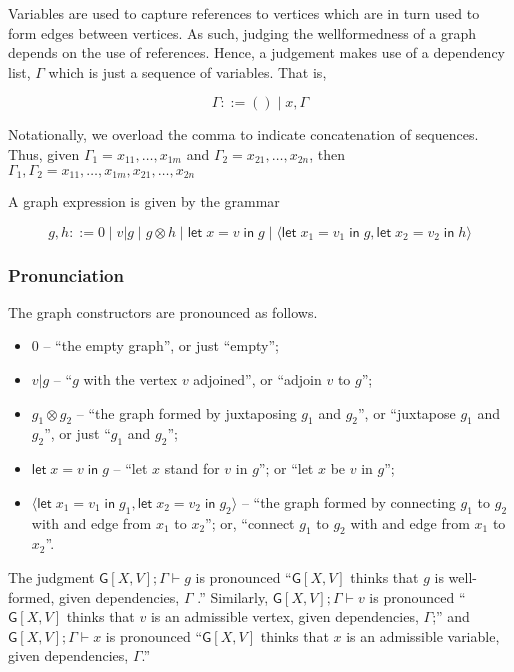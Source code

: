 \documentclass[12pt]{llncs}
\begin{document}
Variables are used to capture references to vertices which are in turn
used to form edges between vertices. As such, judging the wellformedness
of a graph depends on the use of references. Hence, a judgement makes
use of a dependency list, \(\Gamma\) which is just a sequence of
variables. That is,

\[\Gamma ::= () \;|\; x, \Gamma\]

Notationally, we overload the comma to indicate concatenation of
sequences. Thus, given \(\Gamma_1 = x_{11},\ldots,x_{1m}\) and
\(\Gamma_2 = x_{21},\ldots,x_{2n}\), then
\(\Gamma_1,\Gamma_2 = x_{11},\ldots,x_{1m},x_{21},\ldots,x_{2n}\)

A graph expression is given by the grammar

\[g,h ::= 0 \;|\; v|g \;|\; g \otimes h \; |\;\mathsf{let}\; x = v \; \mathsf{in}\; g \;|\; \langle \mathsf{let}\; x_1 = v_1 \; \mathsf{in}\; g, \mathsf{let}\; x_2 = v_2 \; \mathsf{in}\; h\rangle\]

\hypertarget{pronunciation}{%
\subsubsection{Pronunciation}\label{pronunciation}}

The graph constructors are pronounced as follows.

\begin{itemize}
\item
  \(0\) -- ``the empty graph'', or just ``empty'';
\item
  \(v | g\) -- ``\(g\) with the vertex \(v\) adjoined'', or ``adjoin
  \(v\) to \(g\)'';
\item
  \(g_1 \otimes g_2\) -- ``the graph formed by juxtaposing \(g_1\) and
  \(g_2\)'', or ``juxtapose \(g_1\) and \(g_2\)'', or just ``\(g_1\) and
  \(g_2\)'';
\item
  \(\mathsf{let}\; x = v \; \mathsf{in}\; g\) -- ``let \(x\) stand for
  \(v\) in \(g\)''; or ``let \(x\) be \(v\) in \(g\)'';
\item
  \(\langle \mathsf{let}\; x_1 = v_1 \; \mathsf{in}\; g_1,\mathsf{let}\; x_2 = v_2 \; \mathsf{in}\; g_2\rangle\)
  -- ``the graph formed by connecting \(g_1\) to \(g_2\) with and edge
  from \(x_1\) to \(x_2\)''; or, ``connect \(g_1\) to \(g_2\) with and
  edge from \(x_1\) to \(x_2\)''.
\end{itemize}

The judgment \(\mathsf{G}[X,V]; \Gamma \vdash g\) is pronounced
``\(\mathsf{G}[X,V]\) thinks that \(g\) is well-formed, given
dependencies, \(\Gamma\) .'' Similarly,
\(\mathsf{G}[X,V]; \Gamma \vdash v\) is pronounced ``\(\mathsf{G}[X,V]\)
thinks that \(v\) is an admissible vertex, given dependencies,
\(\Gamma\);'' and \(\mathsf{G}[X,V]; \Gamma \vdash x\) is pronounced
``\(\mathsf{G}[X,V]\) thinks that \(x\) is an admissible variable, given
dependencies, \(\Gamma\).''
\end{document}
